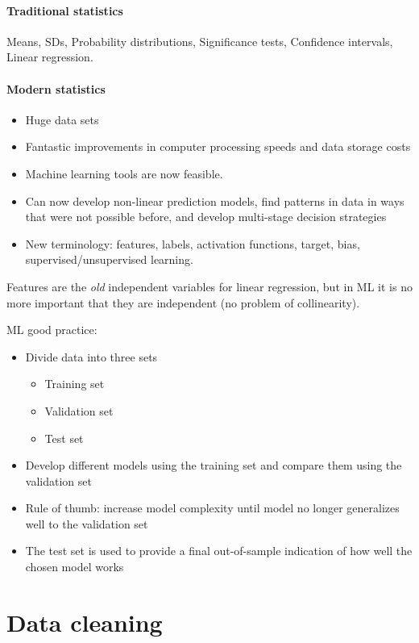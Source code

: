 \paragraph{Traditional statistics} Means, SDs, Probability distributions, Significance tests, Confidence intervals, Linear regression.

\paragraph{Modern statistics}
\begin{itemize}
    \item Huge data sets 
    \item Fantastic improvements in computer processing speeds and data storage costs
    \item Machine learning tools are now feasible.
    \item Can now develop non-linear prediction models, find patterns in data in ways that were not possible before, and develop multi-stage decision strategies
    \item New terminology: features, labels, activation functions, target, bias, supervised/unsupervised learning.
\end{itemize}

Features are the \textit{old} independent variables for linear regression, but in ML it is no more important that they are independent (no problem of collinearity).

ML good practice:
\begin{itemize}
    \item Divide data into three sets
          \begin{itemize}
              \item Training set
              \item Validation set
              \item Test set
          \end{itemize}
    \item Develop different models using the training set and compare them using the validation set
    \item Rule of thumb: increase model complexity until model no longer generalizes well to the validation set
    \item The test set is used to provide a final out-of-sample indication of how well the chosen model works
\end{itemize}

\section{Data cleaning}

